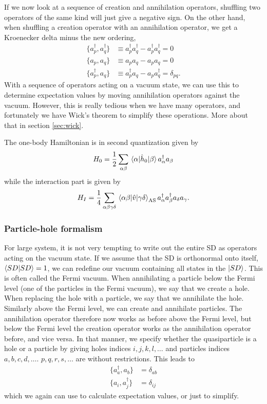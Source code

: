 If we now look at a sequence of creation and annihilation operators, shuffling two operators of the same kind will just give a negative sign. On the other hand, when shuffling a creation operator with an annihilation operator, we get a Kroenecker delta minus the new ordering,
\begin{align}
	\{a_p^{\dagger},a_q^{\dagger}\}&\equiv a_p^{\dagger}a_q^{\dagger}-a_p^{\dagger}a_q^{\dagger}=0\\
	\{a_p,a_q\}&\equiv a_pa_q-a_pa_q=0\\
	\{a_p^{\dagger},a_q\}&\equiv a_p^{\dagger}a_q-a_pa_q^{\dagger}=\delta_{pq}.
\end{align}
With a sequence of operators acting on a vacuum state, we can use this to determine expectation values by moving annihilation operators against the vacuum. However, this is really tedious when we have many operators, and fortunately we have Wick's theorem to simplify these operations. More about that in section \eqref{sec:wick}.

The one-body Hamiltonian is in second quantization given by
\begin{equation}
	H_0=\frac{1}{2}\sum_{\alpha\beta}\mel{\alpha}{\hat{h}_0}{\beta}a_{\alpha}^{\dagger}a_{\beta}
\end{equation}
while the interaction part is given by
\begin{equation}
	H_I=\frac{1}{4}\sum_{\alpha\beta\gamma\delta}\mel{\alpha\beta}{\hat{v}}{\gamma\delta}_{\text{AS}}a_{\alpha}^{\dagger}a_{\beta}^{\dagger}a_{\delta}a_{\gamma}.
\end{equation}

\subsubsection{Particle-hole formalism}
For large system, it is not very tempting to write out the entire SD as operators acting on the vacuum state. If we assume that the SD is orthonormal onto itself, $\braket{SD}{SD}=1$, we can redefine our vacuum containing all states in the $\ket{SD}$. This is often called the Fermi vacuum. When annihilating a particle below the Fermi level (one of the particles in the Fermi vacuum), we say that we create a hole. When replacing the hole with a particle, we say that we annihilate the hole. Similarly above the Fermi level, we can create and annihilate particles. The annihilation operator therefore now works as before above the Fermi level, but below the Fermi level the creation operator works as the annihilation operator before, and vice versa. In that manner, we specify whether the quasiparticle is a hole or a particle by giving holes indices $i,j,k,l,\hdots$ and particles indices $a,b,c,d,\hdots$. $p,q,r,s,\hdots$ are without restrictions. This leads to
\begin{align}
	\{a_a^{\dagger},a_b\}&=\delta_{ab}\\
	\{a_i,a_j^{\dagger}\}&=\delta_{ij}
\end{align}
which we again can use to calculate expectation values, or just to simplify. 

